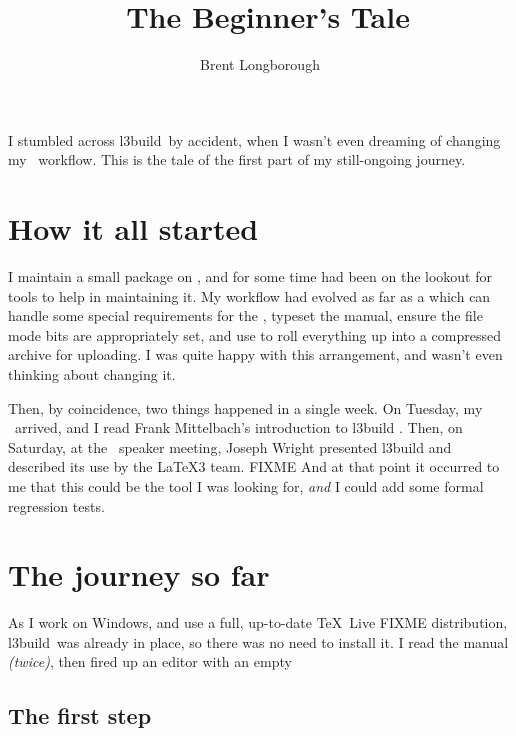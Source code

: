 \documentclass[]{ltugboat}
\title{\lbuild\ \Dash The Beginner's Tale}
\author{Brent Longborough}
\newcommand{\lbuild}{{\sf l3build}}
\begin{document}
\maketitle
\begin{longabstract}
I stumbled across \lbuild\ by accident,
when I wasn't even dreaming of changing my \CTAN\ workflow.
This is the tale of the first part of my still-ongoing journey.
\end{longabstract}

\section{How it all started}
\label{sec:how-it-all}

I maintain a small package on \CTAN, 
and for some time had been on the lookout 
for tools to help in maintaining it.
My workflow had evolved as far as a 
which can handle some special requirements 
for the  ,
typeset the manual, 
ensure the file mode bits are appropriately set, 
and use  to roll everything up 
into a compressed archive for uploading.
I was quite happy with this arrangement, 
and wasn't even thinking about changing it.

Then, by coincidence, 
two things happened in a single week.
On Tuesday, my \TUB\ arrived,
and I read Frank Mittelbach's 
introduction to \lbuild{} \cite{Mittelbach:TB35-3-287}.
Then, on Saturday, 
at the \tug\ speaker meeting,
Joseph Wright presented \lbuild{} 
and described its use by the \LaTeX3 team. FIXME 
And at that point it occurred to me that this 
could be the tool I was looking for, 
\emph{and} I could add some formal regression tests.

\section{The journey so far}
\label{sec:journey-so-far}

As I work on Windows, 
and use a full, up-to-date \TeX\ Live FIXME
distribution, 
\lbuild\ was already in place, 
so there was no need to install it.
I read the manual\cite{Latex3:2014:v5471} \emph{(twice)}, 
then fired up an editor with an empty  

\subsection{The first step}
\label{sec:getting-started}
\end{document}
